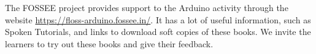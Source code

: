 The FOSSEE project provides support to the Arduino activity through
the website \url{https://floss-arduino.fossee.in/}.  It has a lot of
useful information, such as Spoken Tutorials, and links to download
soft copies of these books.  We invite the learners to try out these
books and give their feedback.  \\ [0.25in]


 \\
 \\
